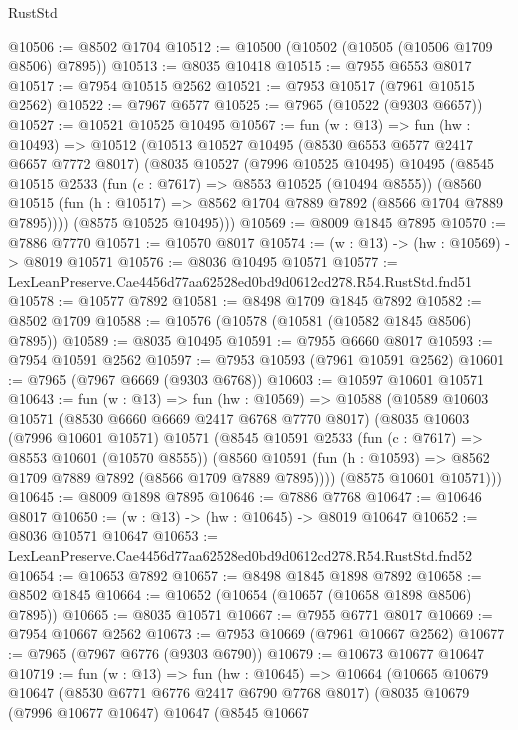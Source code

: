 \begin{lexlean}{RustStd}
\begin{coremodule}
@10506 := @8502 @1704
@10512 := @10500 (@10502 (@10505 (@10506 @1709 @8506) @7895))
@10513 := @8035 @10418
@10515 := @7955 @6553 @8017
@10517 := @7954 @10515 @2562
@10521 := @7953 @10517 (@7961 @10515 @2562)
@10522 := @7967 @6577
@10525 := @7965 (@10522 (@9303 @6657))
@10527 := @10521 @10525 @10495
@10567 := fun (w : @13) =>
  fun (hw : @10493) =>
  @10512
    (@10513
      @10527
      @10495
      (@8530 @6553 @6577 @2417 @6657 @7772 @8017)
      (@8035
        @10527
        (@7996 @10525 @10495)
        @10495
        (@8545
          @10515
          @2533
          (fun (c : @7617) => @8553 @10525 (@10494 @8555))
          (@8560 @10515 (fun (h : @10517) => @8562 @1704 @7889 @7892 (@8566 @1704 @7889 @7895))))
        (@8575 @10525 @10495)))
@10569 := @8009 @1845 @7895
@10570 := @7886 @7770
@10571 := @10570 @8017
@10574 := (w : @13) -> (hw : @10569) -> @8019 @10571
@10576 := @8036 @10495 @10571
@10577 := LexLeanPreserve.Cae4456d77aa62528ed0bd9d0612cd278.R54.RustStd.fnd51
@10578 := @10577 @7892
@10581 := @8498 @1709 @1845 @7892
@10582 := @8502 @1709
@10588 := @10576 (@10578 (@10581 (@10582 @1845 @8506) @7895))
@10589 := @8035 @10495
@10591 := @7955 @6660 @8017
@10593 := @7954 @10591 @2562
@10597 := @7953 @10593 (@7961 @10591 @2562)
@10601 := @7965 (@7967 @6669 (@9303 @6768))
@10603 := @10597 @10601 @10571
@10643 := fun (w : @13) =>
  fun (hw : @10569) =>
  @10588
    (@10589
      @10603
      @10571
      (@8530 @6660 @6669 @2417 @6768 @7770 @8017)
      (@8035
        @10603
        (@7996 @10601 @10571)
        @10571
        (@8545
          @10591
          @2533
          (fun (c : @7617) => @8553 @10601 (@10570 @8555))
          (@8560 @10591 (fun (h : @10593) => @8562 @1709 @7889 @7892 (@8566 @1709 @7889 @7895))))
        (@8575 @10601 @10571)))
@10645 := @8009 @1898 @7895
@10646 := @7886 @7768
@10647 := @10646 @8017
@10650 := (w : @13) -> (hw : @10645) -> @8019 @10647
@10652 := @8036 @10571 @10647
@10653 := LexLeanPreserve.Cae4456d77aa62528ed0bd9d0612cd278.R54.RustStd.fnd52
@10654 := @10653 @7892
@10657 := @8498 @1845 @1898 @7892
@10658 := @8502 @1845
@10664 := @10652 (@10654 (@10657 (@10658 @1898 @8506) @7895))
@10665 := @8035 @10571
@10667 := @7955 @6771 @8017
@10669 := @7954 @10667 @2562
@10673 := @7953 @10669 (@7961 @10667 @2562)
@10677 := @7965 (@7967 @6776 (@9303 @6790))
@10679 := @10673 @10677 @10647
@10719 := fun (w : @13) =>
  fun (hw : @10645) =>
  @10664
    (@10665
      @10679
      @10647
      (@8530 @6771 @6776 @2417 @6790 @7768 @8017)
      (@8035
        @10679
        (@7996 @10677 @10647)
        @10647
        (@8545
          @10667

\end{coremodule}
\end{lexlean}
